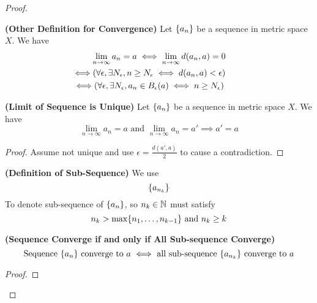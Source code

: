 \documentclass{report}
\begin{document}
\begin{proof}
\begin{definition}
\end{definition}
\begin{theorem}
\label{3.1.5}
\textbf{(Other Definition for Convergence)} Let $\{ a_n \}$ be a sequence in metric space $X$. We have
 \begin{gather}
\lim_{n\to \infty}a_n=a\iff \lim_{n\to\infty}d(a_n,a)=0\\
\liff (\forall \epsilon ,\exists N_\epsilon, n\geq N_\epsilon \iff  d(a_n,a)<\epsilon) \\
\liff (\forall \epsilon, \exists N_\epsilon , a_n\in B_\epsilon (a)\iff  n\geq N_\epsilon )
\end{gather}
\end{theorem}
\begin{theorem}
\label{3.1.6}
\textbf{(Limit of Sequence is Unique)} Let $\{ a_n \}$ be a sequence in metric space $X$. We have
 \begin{equation}
\lim_{n\to\infty}a_n=a\text{ and }\lim_{n\to\infty}a_n=a'\implies a'=a
\end{equation}
\end{theorem}
\begin{proof}
Assume not unique and use $\epsilon=\frac{d(a',a)}{2}$ to cause a contradiction.
\end{proof}
\begin{definition}
\label{3.1.7}
\textbf{(Definition of Sub-Sequence)} We use
\begin{equation}
\{ a_{n_k} \}
\end{equation}
To denote sub-sequence of $\{ a_n \}$, so $n_k\in\mathbb{N}$ must satisfy
 \begin{equation}
n_k> \max \{ n_1,\dots, n_{k-1} \}\text{ and }n_k\geq k 
\end{equation}
\end{definition}
\begin{theorem}
\label{3.1.8}
\textbf{(Sequence Converge if and only if All Sub-sequence Converge)} 
\begin{equation}
\text{ Sequence $\{ a_n \}$ converge to $a$ $\iff $ all sub-sequence $\{ a_{n_k} \}$ converge to $a$ }
\end{equation}
\end{theorem}
\begin{proof}

\end{proof}
\end{proof}
\end{document}

